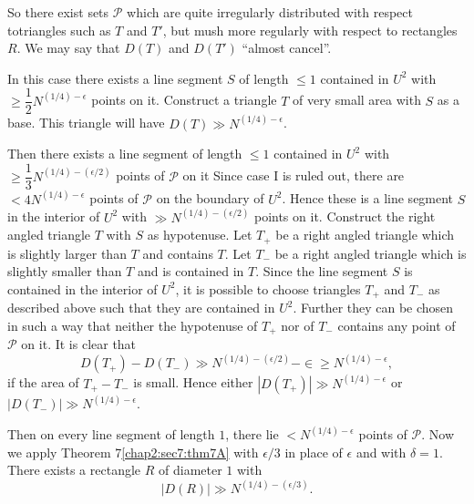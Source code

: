 So there exist sets $\mathscr{P}$ which are quite irregularly distributed with respect to\pageoriginale triangles such as $T$ and $T'$, but mush more regularly with respect to rectangles $R$. We may say that $D(T)$ and $D(T')$ ``almost cancel''.

\medskip
{}

\medskip
{}

In this case there exists a line segment $S$ of length $\leq 1$ contained in $U^{2}$ with $\geq \dfrac{1}{2} N^{(1/4)-\epsilon}$ points on it. Construct a triangle $T$ of very small area with $S$ as a base. This triangle will have $D(T) \gg N^{(1/4)-\epsilon}$.

\medskip
{}

Then there exists a line segment of length $\leq 1$ contained in $U^{2}$ with $\geq \dfrac{1}{3} N^{(1/4)-(\epsilon/2)}$ points of $\mathscr{P}$ on it Since case I is ruled out, there are $< 4N^{(1/4)-\epsilon}$ points of $\mathscr{P}$ on the boundary of $U^{2}$. Hence these is a line segment $S$ in the interior of $U^{2}$ with $\gg N^{(1/4)-(\epsilon/2)}$ points on it. Construct the right angled triangle $T$ with $S$ as hypotenuse. Let $T_+$ be a right angled triangle which is slightly larger than $T$ and contains $T$. Let $T_{-}$ be a right angled triangle which is slightly smaller than $T$ and is contained in $T$. Since the line segment $S$ is contained in the interior of $U^{2}$, it is possible to choose triangles $T_{+}$ and $T_{-}$ as described above such that they are contained in $U^{2}$. Further they can be chosen in such a way that neither the hypotenuse of $T_{+}$ nor of $T_{-}$ contains any point of $\mathscr{P}$ on it. It is clear that
$$
D(T_{+}) - D(T_{-}) \gg N^{(1/4)-(\epsilon/2)} - \in \geq N^{(1/4)-\epsilon},
$$
if the area of $T_{+} - T_{-}$ is small. Hence either $|D(T_{+})| \gg N^{(1/4)-\epsilon}$ or $|D(T_{-})| \gg N^{(1/4)-\epsilon}$.

\medskip
{}\pageoriginale Then on every line segment of length $1$, there lie $< N^{(1/4)-\epsilon}$ points of $\mathscr{P}$. Now we apply Theorem 7\ref{chap2:sec7:thm7A} with $\epsilon/3$ in place of $\epsilon$ and with $\delta = 1$. There exists a rectangle $R$ of diameter $1$ with
$$
|D(R)| \gg N^{(1/4)-(\epsilon/3)}.
$$

